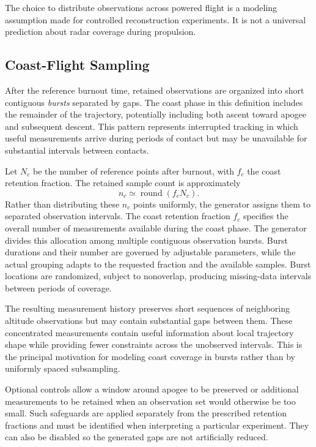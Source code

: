 The choice to distribute observations across powered flight
is a modeling assumption made for controlled reconstruction
experiments. It is not a universal prediction about radar
coverage during propulsion.

\subsection{Coast-Flight Sampling}
\label{sec:noise-coast}

After the reference burnout time, retained observations are
organized into short contiguous \emph{bursts} separated by gaps.
The coast phase in this definition includes the remainder
of the trajectory, potentially including both ascent toward
apogee and subsequent descent. This pattern represents
interrupted tracking in which useful measurements arrive
during periods of contact but may be unavailable for
substantial intervals between contacts.

Let $N_c$ be the number of reference points after burnout,
with $f_c$ the coast retention fraction. The retained sample
count is approximately
\begin{equation}
    n_c \simeq \operatorname{round}(f_c N_c).
    \label{eq:noise-coast-count}
\end{equation}
Rather than distributing these $n_c$ points uniformly, the
generator assigns them to separated observation intervals.
The coast retention fraction $f_c$ specifies the overall
number of measurements available during the coast phase.
The generator divides this allocation among multiple
contiguous observation bursts. Burst durations and their
number are governed by adjustable parameters, while the
actual grouping adapts to the requested fraction and the
available samples. Burst locations are randomized, subject
to nonoverlap, producing missing-data intervals between
periods of coverage.

The resulting measurement history preserves short sequences
of neighboring altitude observations but may contain
substantial gaps between them. These concentrated
measurements contain useful information about local
trajectory shape while providing fewer constraints across
the unobserved intervals. This is the principal motivation
for modeling coast coverage in bursts rather than by
uniformly spaced subsampling.

Optional controls allow a window around apogee to be
preserved or additional measurements to be retained
when an observation set would otherwise be too small.
Such safeguards are applied separately from the
prescribed retention fractions and must be identified
when interpreting a particular experiment. They can
also be disabled so the generated gaps are not
artificially reduced.

